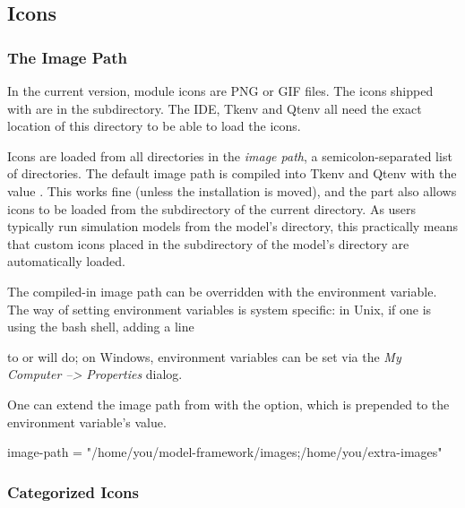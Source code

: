 \subsection{Icons}
\label{sec:graphics:icon-library}

\subsubsection{The Image Path}
\label{sec:graphics:image-path}

In the current {\opp} version, module icons are PNG or GIF files. The icons shipped
with {\opp} are in the  subdirectory. The IDE, Tkenv and Qtenv all
need the exact location of this directory to be able to load the icons.

Icons are loaded from all directories in the \textit{image path},
a semicolon-separated list of directories.
The default image path is compiled into Tkenv and Qtenv with the value
. This works fine (unless the
{\opp} installation is moved), and the  part also allows
icons to be loaded from the  subdirectory of the current
directory. As users typically run simulation models from the model's
directory, this practically means that custom icons placed in the
 subdirectory of the model's directory are automatically
loaded.

The compiled-in image path can be overridden with the 
environment variable. The way of setting environment variables is system
specific: in Unix, if one is using the bash shell, adding a line


to  or  will do;
on Windows, environment variables can be set via the \textit{My Computer --> Properties} dialog.

One can extend the image path from  with the
 option, which is prepended to the environment
variable's value.

\begin{inifile}
[General]
image-path = "/home/you/model-framework/images;/home/you/extra-images"
\end{inifile}


\subsubsection{Categorized Icons}
\label{sec:graphics:categorized-icons}

